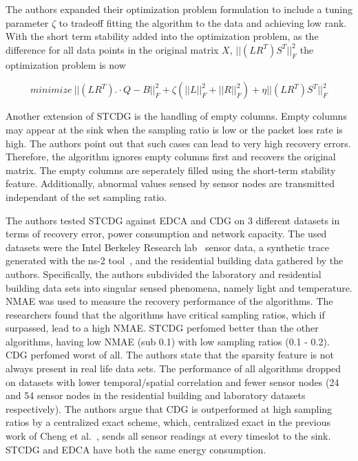 The authors expanded their optimization problem formulation to include a tuning
parameter $ \zeta $ to tradeoff fitting the algorithm to the data and achieving
low rank. With the short term stability added into the optimization problem, as
the difference for all data points in the original matrix $ X $, $
||(LR^T)S^T||^2_F $ the optimization problem is now

$$
minimize \ ||(LR^T). \cdot Q-B||^2_F + \zeta(||L||^2_F + ||R||^2_F) + \eta ||(LR^T)S^T||^2_F
$$

Another extension of \ac{STCDG} is the handling of empty columns. Empty
columns may appear at the sink when the sampling ratio is low or the packet
loss rate is high. The authors point out that such cases can lead to very high
recovery errors. Therefore, the algorithm ignores empty columns first and
recovers the original matrix. The empty columns are seperately filled using the
short-term stability feature. Additionally, abnormal values sensed by sensor
nodes are transmitted independant of the set sampling ratio.

The authors tested \ac{STCDG} against \ac{EDCA} and \ac{CDG} on 3 different
datasets in terms of recovery error, power consumption and network capacity.
The used datasets were the Intel Berkeley Research lab~\cite{labdata} sensor
data, a synthetic trace generated with the ns-2 tool~\cite{bajaj1999improving},
and the residential building data gathered by the authors. Specifically, the
authors subdivided the laboratory and residential building data sets into
singular sensed phenomena, namely light and temperature. \ac{NMAE} was used to
measure the recovery performance of the algorithms. The researchers found that
the algorithms have critical sampling ratios, which if surpassed, lead to a
high \ac{NMAE}. \ac{STCDG} perfomed better than the other algorithms, having
low \ac{NMAE} (sub 0.1) with low sampling ratios (0.1 - 0.2). \ac{CDG} perfomed
worst of all. The authors state that the sparsity feature is not always present
in real life data sets. The performance of all algorithms dropped on datasets
with lower temporal/spatial correlation and fewer sensor nodes (24 and 54
sensor nodes in the residential building and laboratory datasets respectively).
The authors argue that \ac{CDG} is outperformed at high sampling ratios by a
centralized exact scheme, which, centralized exact in the previous work of
Cheng et al.~\cite{cheng2013stcdg}, sends all sensor readings at every timeslot
to the sink. \ac{STCDG} and \ac{EDCA} have both the same energy consumption.


